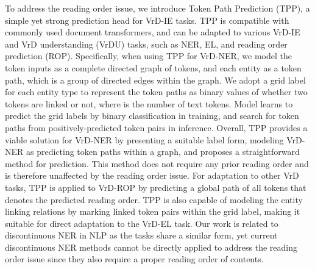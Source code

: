 \documentclass[11pt]{article}
\begin{document}
To address the reading order issue, we introduce Token Path Prediction (TPP), a simple yet strong prediction head for VrD-IE tasks. TPP is compatible with commonly used document transformers, and can be adapted to various VrD-IE and VrD understanding (VrDU) tasks, such as NER, EL, and reading order prediction (ROP). 
Specifically, when using TPP for VrD-NER, we model the token inputs as a complete directed graph of tokens, and each entity as a token path, which is a group of directed edges within the graph. We adopt a grid label for each entity type to represent the token paths as  binary values of whether two tokens are linked or not, where  is the number of text tokens. Model learns to predict the grid labels by binary classification in training, and search for token paths from positively-predicted token pairs in inference.
Overall, TPP provides a viable solution for VrD-NER by presenting a suitable label form, modeling VrD-NER as predicting token paths within a graph, and proposes a straightforward method for prediction.
This method does not require any prior reading order and is therefore unaffected by the reading order issue. 
For adaptation to other VrD tasks, TPP is applied to VrD-ROP by predicting a global path of all tokens that denotes the predicted reading order. 
TPP is also capable of modeling the entity linking relations by marking linked token pairs within the grid label, making it suitable for direct adaptation to the VrD-EL task.
Our work is related to discontinuous NER in NLP as the tasks share a similar form, yet current discontinuous NER methods cannot be directly applied to address the reading order issue since they also require a proper reading order of contents.
\end{document}
